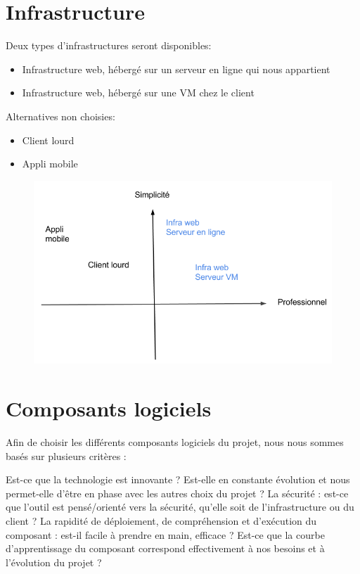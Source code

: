 \section{Infrastructure}
Deux types d'infrastructures seront disponibles:
\begin{itemize}
\item Infrastructure web, hébergé sur un serveur en ligne qui nous appartient
\item Infrastructure web, hébergé sur une VM chez le client
\end{itemize}

Alternatives non choisies:
\begin{itemize}
\item Client lourd
\item Appli mobile
\end{itemize}

\begin{figure}[!h]
  \includegraphics[width=18cm]{choix-infra.png}
\end{figure}

\newpage


\section{Composants logiciels}
Afin de choisir les différents composants logiciels du projet, nous nous sommes basés sur plusieurs critères :

Est-ce que la technologie est innovante ? Est-elle en constante évolution et nous permet-elle d'être en phase avec les autres choix du projet ?
La sécurité : est-ce que l'outil est pensé/orienté vers la sécurité, qu'elle soit de l'infrastructure ou du client ?
La rapidité de déploiement, de compréhension et d'exécution du composant : est-il facile à prendre en main, efficace ? Est-ce que la courbe d'apprentissage du composant correspond effectivement à nos besoins et à l'évolution du projet ?

